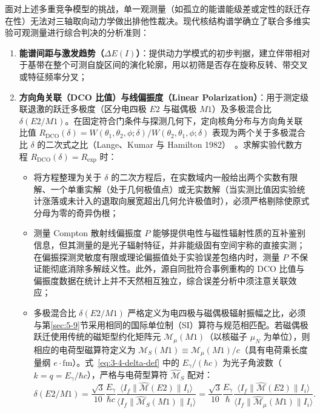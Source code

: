 面对上述多重竞争模型的挑战，单一观测量（如孤立的能谱能级差或定性的跃迁存在性）无法对三轴取向动力学做出排他性裁决。现代核结构谱学确立了联合多维实验可观测量进行综合判决的分析准则：
\begin{enumerate}
\item \textbf{能谱间距与激发趋势（$\Delta E(I)$）}：提供动力学模式的初步判据，建立伴带相对于基带在整个可测自旋区间的演化轮廓，用以初筛是否存在旋称反转、带交叉或特征频率分叉；
\item \textbf{方向角关联（DCO 比值）与线偏振度（Linear Polarization）}：用于测定级联退激的跃迁多极度（区分电四极 $E2$ 与磁偶极 $M1$）及多极混合比 $\delta(E2/M1)$。在固定符合门条件与探测几何下，定向核角分布与方向角关联比值 $R_{\text{DCO}}(\delta) = W(\theta_1, \theta_2, \phi; \delta) / W(\theta_2, \theta_1, \phi; \delta)$ 表现为两个关于多极混合比 $\delta$ 的二次式之比（Lange、Kumar 与 Hamilton 1982）~\cite{lange-kumar-hamilton-1982-multipole-admixtures}。求解实验代数方程 $R_{\text{DCO}}(\delta) = R_{\text{exp}}$ 时：
\begin{itemize}
\item 将方程整理为关于 $\delta$ 的二次方程后，在实数域内一般给出两个实数有限解、一个单重实解（处于几何极值点）或无实数解（当实测比值因实验统计涨落或未计入的退取向展宽超出几何允许极值时），必须严格剔除使原式分母为零的奇异伪根；
\item 测量 Compton 散射线偏振度 $P$ 能够提供电性与磁性辐射性质的互补鉴别信息，但其测量的是光子辐射特征，并非能级固有空间宇称的直接实测；在偏振探测灵敏度有限或理论偏振值处于实验误差包络内时，测量 $P$ 不保证能彻底消除多解歧义性。此外，源自同批符合事例重构的 DCO 比值与偏振度数据在统计上并不天然相互独立，综合误差分析中须注意关联效应；
\item 多极混合比 $\delta(E2/M1)$ 严格定义为电四极与磁偶极辐射振幅之比，必须与第\ref{sec:5-9}节采用相同的国际单位制（SI）算符与规范相匹配。若磁偶极跃迁使用传统的磁矩型约化矩阵元 $\mathcal{M}_\mu(M1)$（以核磁子 $\mu_N$ 为单位），则相应的电荷型磁算符定义为 $\mathcal{M}_S(M1) \equiv \mathcal{M}_\mu(M1)/c$（具有电荷乘长度量纲 $e\cdot\mathrm{fm}$）。式~\eqref{eq:3-4-delta-def} 中的 $E_\gamma/(\hbar c)$ 为光子角波数（$k = q = E_\gamma/\hbar c$），严格与电荷型算符 $\hat{\mathcal{M}}_S$ 配对：
\begin{equation}\label{eq:3-4-delta-def}
\delta(E2/M1) = \frac{\sqrt{3}}{10} \frac{E_\gamma}{\hbar c} \frac{\langle I_f \| \hat{\mathcal{M}}(E2) \| I_i \rangle}{\langle I_f \| \hat{\mathcal{M}}_S(M1) \| I_i \rangle} = \frac{\sqrt{3}}{10} \frac{E_\gamma}{\hbar} \frac{\langle I_f \| \hat{\mathcal{M}}(E2) \| I_i \rangle}{\langle I_f \| \hat{\mathcal{M}}_\mu(M1) \| I_i \rangle}.

\end{equation}
\end{itemize}
\end{enumerate}
